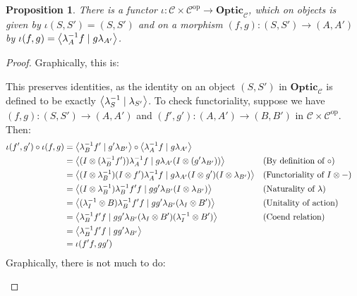 \documentclass[11pt,letterpaper]{article}
\theoremstyle{plain}
\newtheorem{proposition}[theorem]{Proposition}
\theoremstyle{definition}
\newcommand{\C}{\mathscr{C}}
\newcommand{\Optic}{\mathbf{Optic}}
\newcommand{\op}{\mathrm{op}}
\newcommand{\rep}[2]{{\ensuremath \left\langle #1 \mid #2 \right\rangle}}
\begin{document}
\begin{proposition}\label{prop:iota-functor}
  There is a functor $\iota : \C \times \C^\op \to \Optic_\C$, which on objects is given by $\iota(S, S') = (S, S')$ and on a morphism $(f, g) : (S, S') \to (A, A')$ by $\iota(f, g) = \rep{\lambda_A^{-1} f}{g \lambda_{A'}}$.
\end{proposition}
\begin{proof}
  Graphically, this is:
  \begin{center}
    
  \end{center}

  This preserves identities, as the identity on an object $(S, S')$ in $\Optic_\C$ is defined to be exactly $\rep{\lambda^{-1}_S}{\lambda_{S'}}$. To check functoriality, suppose we have $(f, g) : (S, S') \to (A, A')$ and $(f', g') : (A, A') \to (B, B')$ in $\C \times \C^\op$. Then:
  \begin{align*}
    \iota(f', g') \circ \iota(f, g)
    &= \rep{\lambda^{-1}_B f'}{g' \lambda_{B'}} \circ \rep{\lambda^{-1}_A f}{g \lambda_{A'}} \\
    &= \rep{(I\otimes (\lambda^{-1}_B f'))\lambda^{-1}_A f}{g \lambda_{A'} (I\otimes (g' \lambda_{B'}))} && \text{(By definition of $\circ$)}\\
    &= \rep{(I \otimes \lambda^{-1}_B) (I \otimes f')\lambda^{-1}_A f}{g \lambda_{A'} (I \otimes g')(I\otimes \lambda_{B'})} && \text{(Functoriality of $I \otimes -$)}\\
    &= \rep{(I\otimes \lambda^{-1}_B) \lambda^{-1}_B f' f}{g g' \lambda_{B'} (I\otimes \lambda_{B'})} && \text{(Naturality of $\lambda$)}\\
    &= \rep{(\lambda^{-1}_I \otimes B) \lambda^{-1}_B f' f}{g g' \lambda_{B'} (\lambda_I \otimes B')} && \text{(Unitality of action)} \\
    &= \rep{\lambda^{-1}_B f' f}{g g' \lambda_{B'} (\lambda_I \otimes B') (\lambda^{-1}_I \otimes B')} && \text{(Coend relation)}  \\
    &= \rep{\lambda^{-1}_B f'f}{g g' \lambda_{B'}} \\
    &= \iota(f'f, gg')
  \end{align*}
  Graphically, there is not much to do:
  \begin{center}
    
    \qquad \raisebox{0.3cm}{$=$} \qquad
    
  \end{center}
\end{proof}
\end{document}
